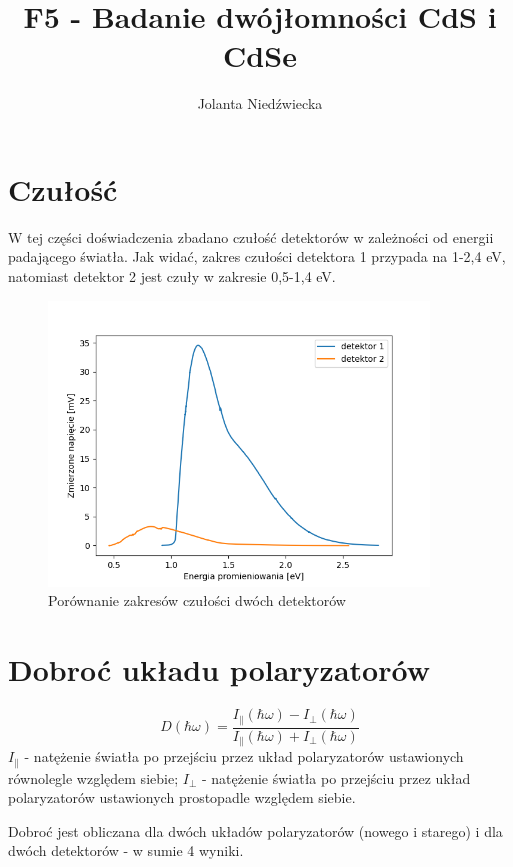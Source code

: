 \documentclass{article}
\title{F5 - Badanie dwójłomności CdS i CdSe}
\author{Jolanta Niedźwiecka}
\begin{document}
    \maketitle



\section{Czułość}

    W tej części doświadczenia zbadano czułość detektorów w zależności od energii padającego światła. Jak widać, zakres czułości detektora 1 przypada na 1-2,4 eV, natomiast detektor 2 jest czuły w zakresie 0,5-1,4 eV.

    \begin{figure}[h]
        \centering
        \includegraphics[width=0.9\textwidth]{sensitivity.png}
        \caption{Porównanie zakresów czułości dwóch detektorów}
    \end{figure}

\section{Dobroć układu polaryzatorów}

    \begin{equation}
        D(\hbar\omega)=
        \frac{I_\parallel(\hbar\omega)-I_\perp(\hbar\omega)}
        {I_\parallel(\hbar\omega)+I_\perp(\hbar\omega)}
    \end{equation}
    $I_\parallel$ - natężenie światła po przejściu przez układ polaryzatorów ustawionych równolegle względem siebie; $I_\perp$ - natężenie światła po przejściu przez układ polaryzatorów ustawionych prostopadle względem siebie.

    Dobroć jest obliczana dla dwóch układów polaryzatorów (nowego i starego) i dla dwóch detektorów - w sumie 4 wyniki.
\end{document}
